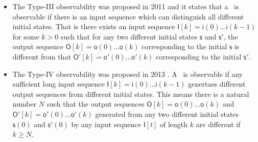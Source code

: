 \begin{itemize}
\item The  {\sf Type-III} observability was proposed in 2011 \cite{Cheng2011Identification} and it states that a \BCN\  is observable if there is an input sequence which can distinguish all different initial states. That is there exists an input sequence  $\mathsf{I}[k]=\mathsf{i}(0)\ldots\mathsf{i}(k-1)$ for some $k>0$ such that for any two different initial states $\mathsf{s}$ and $\mathsf{s}'$, the output sequence $\mathsf{O}[k]=\mathsf{o}(0)\ldots\mathsf{o}(k)$  corresponding to the initial  $\mathsf{s}$  is different from that  $\mathsf{O}'[k]=\mathsf{o}'(0)\ldots\mathsf{o}'(k)$ corresponding to the initial $\mathsf{s}'$.


	
\item The  {\sf Type-IV}  observability was  proposed in 2013 \cite{Fornasini2013Observability}. A  \BCN\ is observable if any sufficient long input sequence  $\mathsf{I}[k]=\mathsf{i}(0)\ldots\mathsf{i}(k-1)$  genertaes different output sequences  from different initial states. This means there is a  natural number $N$ such that  the output sequences $\mathsf{O}[k]=\mathsf{o}(0) \ldots\mathsf{o}(k)$ and  $\mathsf{O}'[k]=\mathsf{o}'(0)\ldots\mathsf{o}'(k)$  generated from any two different initial states $\mathsf{s}(0)$ and $\mathsf{s}'(0)$ by any input sequence $\mathsf{I}[t]$  of length $k$ are different if $k\geq N$.


\end{itemize}
